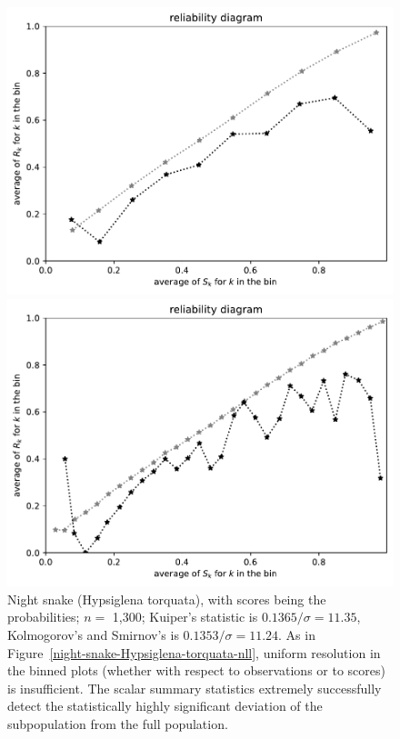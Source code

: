 \documentclass{article}
\begin{document}
\begin{figure}
\begin{centering}
\parbox{\imsize}{\includegraphics[width=\imsize]
{./codes/unweighted/prob-1-60-night-snake-Hypsiglena-torquataequiscore10}}
\quad\quad
\parbox{\imsize}{\includegraphics[width=\imsize]
{./codes/unweighted/prob-1-60-night-snake-Hypsiglena-torquataequiscore30}}

\end{centering}
\caption{Night snake (Hypsiglena torquata),
         with scores being the probabilities;
         $n =$ 1,300; Kuiper's statistic is $0.1365 / \sigma = 11.35$,
         Kolmogorov's and Smirnov's is $0.1353 / \sigma = 11.24$.
As in Figure~\ref{night-snake-Hypsiglena-torquata-nll},
uniform resolution in the binned plots
(whether with respect to observations or to scores) is insufficient.
The scalar summary statistics extremely successfully
detect the statistically highly significant deviation
of the subpopulation from the full population.
}
\label{night-snake-Hypsiglena-torquata-prob}
\end{figure}
\end{document}
